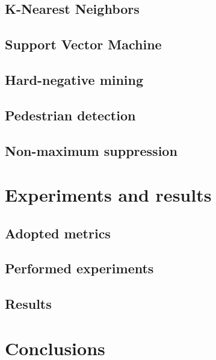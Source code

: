 \documentclass[journal,twocolumn]{IEEEtran}
\begin{document}
\subsection{K-Nearest Neighbors}

\subsection{Support Vector Machine}

\subsection{Hard-negative mining}

\subsection{Pedestrian detection}

\subsection{Non-maximum suppression}

\section{Experiments and results}
\label{sec:exp}

\subsection{Adopted metrics}

\subsection{Performed experiments}

\subsection{Results}

\section{Conclusions}
\label{sec:conc}

\printbibliography
\end{document}
